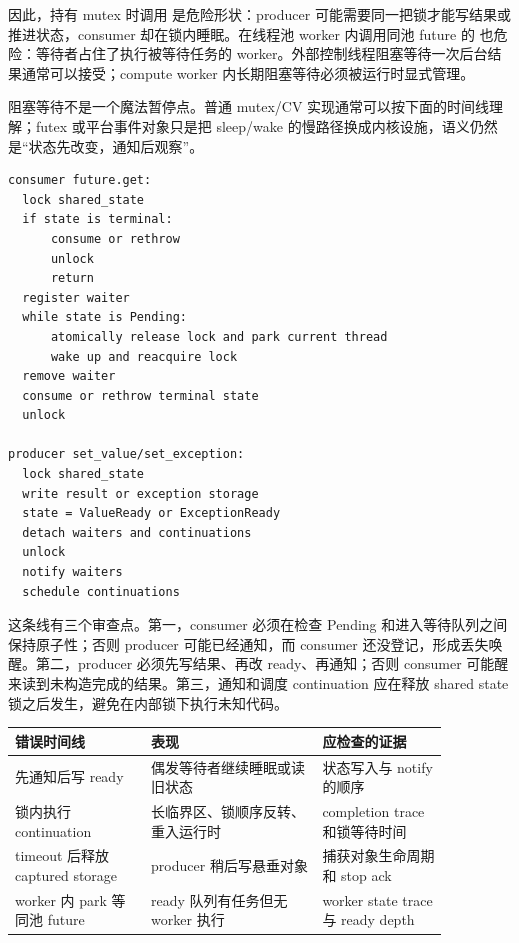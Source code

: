 因此，持有 mutex 时调用  是危险形状：producer 可能需要同一把锁才能写结果或推进状态，consumer 却在锁内睡眠。在线程池 worker 内调用同池 future 的  也危险：等待者占住了执行被等待任务的 worker。外部控制线程阻塞等待一次后台结果通常可以接受；compute worker 内长期阻塞等待必须被运行时显式管理。

阻塞等待不是一个魔法暂停点。普通 mutex/CV 实现通常可以按下面的时间线理解；futex 或平台事件对象只是把 sleep/wake 的慢路径换成内核设施，语义仍然是“状态先改变，通知后观察”。

\begin{lstlisting}[numbers=none,caption={future.get 的 park/unpark 时间线}]
consumer future.get:
  lock shared_state
  if state is terminal:
      consume or rethrow
      unlock
      return
  register waiter
  while state is Pending:
      atomically release lock and park current thread
      wake up and reacquire lock
  remove waiter
  consume or rethrow terminal state
  unlock

producer set_value/set_exception:
  lock shared_state
  write result or exception storage
  state = ValueReady or ExceptionReady
  detach waiters and continuations
  unlock
  notify waiters
  schedule continuations
\end{lstlisting}

这条线有三个审查点。第一，consumer 必须在检查 Pending 和进入等待队列之间保持原子性；否则 producer 可能已经通知，而 consumer 还没登记，形成丢失唤醒。第二，producer 必须先写结果、再改 ready、再通知；否则 consumer 可能醒来读到未构造完成的结果。第三，通知和调度 continuation 应在释放 shared state 锁之后发生，避免在内部锁下执行未知代码。

\begin{center}
\small
\begin{tabular}{p{0.27\linewidth}p{0.34\linewidth}p{0.25\linewidth}}
\toprule
错误时间线 & 表现 & 应检查的证据 \\
\midrule
先通知后写 ready & 偶发等待者继续睡眠或读旧状态 & 状态写入与 notify 的顺序 \\
锁内执行 continuation & 长临界区、锁顺序反转、重入运行时 & completion trace 和锁等待时间 \\
timeout 后释放 captured storage & producer 稍后写悬垂对象 & 捕获对象生命周期和 stop ack \\
worker 内 park 等同池 future & ready 队列有任务但无 worker 执行 & worker state trace 与 ready depth \\
\bottomrule
\end{tabular}
\end{center}


